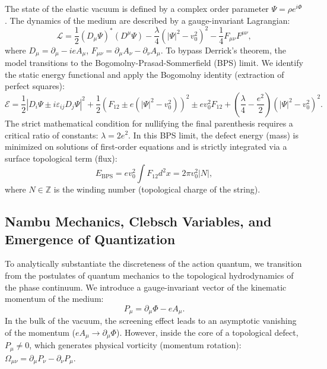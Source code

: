 \documentclass[11pt,a4paper]{article}
\begin{document}
The state of the elastic vacuum is defined by a complex order parameter $\Psi = \rho e^{i\Phi}$. The dynamics of the medium are described by a gauge-invariant Lagrangian:
\begin{equation}
\mathcal{L} = \frac{1}{2} (D_\mu \Psi)^* (D^\mu \Psi) - \frac{\lambda}{4} (|\Psi|^2 - v_0^2)^2 - \frac{1}{4} F_{\mu\nu} F^{\mu\nu},
\label{eq:lagrangian}
\end{equation}
where $D_\mu = \partial_\mu - i e A_\mu$, $F_{\mu\nu} = \partial_\mu A_\nu - \partial_\nu A_\mu$. 
To bypass Derrick's theorem, the model transitions to the Bogomolny-Prasad-Sommerfield (BPS) limit. We identify the static energy functional and apply the Bogomolny identity (extraction of perfect squares):
\begin{equation}
\mathcal{E} = \frac{1}{2} |D_i \Psi \pm i \varepsilon_{ij} D_j \Psi|^2 + \frac{1}{2} \left(F_{12} \pm e(|\Psi|^2 - v_0^2)\right)^2 \pm e v_0^2 F_{12} + \left(\frac{\lambda}{4} - \frac{e^2}{2}\right) (|\Psi|^2 - v_0^2)^2.
\end{equation}
The strict mathematical condition for nullifying the final parenthesis requires a critical ratio of constants: $\lambda = 2e^2$. In this BPS limit, the defect energy (mass) is minimized on solutions of first-order equations and is strictly integrated via a surface topological term (flux):
\begin{equation}
E_{\text{BPS}} = e v_0^2 \int F_{12} d^2x = 2\pi v_0^2 |N|,
\end{equation}
where $N \in \mathbb{Z}$ is the winding number (topological charge of the string).

\subsection{Nambu Mechanics, Clebsch Variables, and Emergence of Quantization}
To analytically substantiate the discreteness of the action quantum, we transition from the postulates of quantum mechanics to the topological hydrodynamics of the phase continuum.
We introduce a gauge-invariant vector of the kinematic momentum of the medium:
\begin{equation}
	P_\mu = \partial_\mu \Phi - e A_\mu.
\end{equation}
In the bulk of the vacuum, the screening effect leads to an asymptotic vanishing of the momentum ($e A_\mu \to \partial_\mu \Phi$). However, inside the core of a topological defect, $P_\mu \neq 0$, which generates physical vorticity (momentum rotation): $\Omega_{\mu\nu} = \partial_\mu P_\nu - \partial_\nu P_\mu$.
\end{document}

